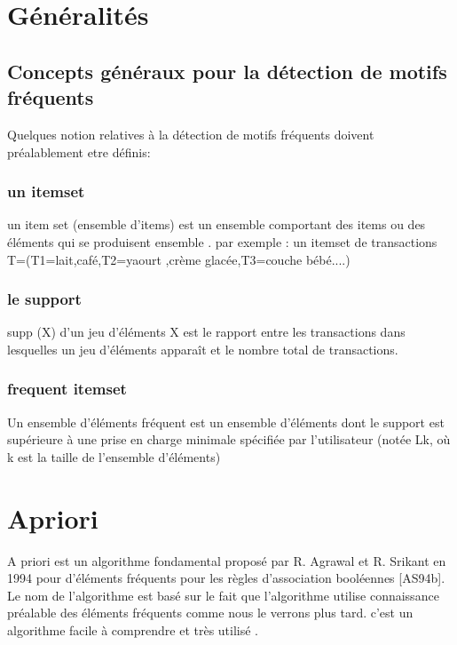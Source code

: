 \documentclass[12pt,a4paper,oneside]{book}
\begin{document}
	
		\def\reportnumber{}
		\def\reporttitle{Algorithme Apriori et PF-growth}
		
		
		
		\sffamily
		
		\setcounter{tocdepth}{3}
		\tableofcontents
		\newpage

\chapter{Généralités}
\section*{Concepts généraux pour la détection de motifs fréquents}
Quelques notion relatives à la détection de motifs fréquents doivent préalablement etre définis: 

\subsection*{un itemset}
un item set (ensemble d'items) est un ensemble comportant des items ou des éléments qui se produisent ensemble .
par exemple : un itemset de transactions T=(T1={lait,café},T2={yaourt ,crème glacée},T3={couche bébé}....)
\subsection*{le support}
supp (X) d'un jeu d'éléments X est le rapport entre les transactions dans lesquelles un jeu d'éléments apparaît et le nombre total de transactions.
\subsection*{frequent itemset}
Un ensemble d'éléments fréquent est un ensemble d'éléments dont le support est supérieure à une prise en charge minimale spécifiée par l'utilisateur (notée Lk, où k est la taille de l'ensemble d'éléments)


\chapter{Apriori}

A priori
est un algorithme fondamental proposé par R. Agrawal et R. Srikant en 1994 pour
d’éléments fréquents pour les règles d’association booléennes [AS94b]. 
Le nom de l'algorithme
est basé sur le fait que l'algorithme utilise
connaissance préalable
des éléments fréquents
comme nous le verrons plus tard.
c'est un algorithme facile à comprendre et très utilisé .
\end{document}
